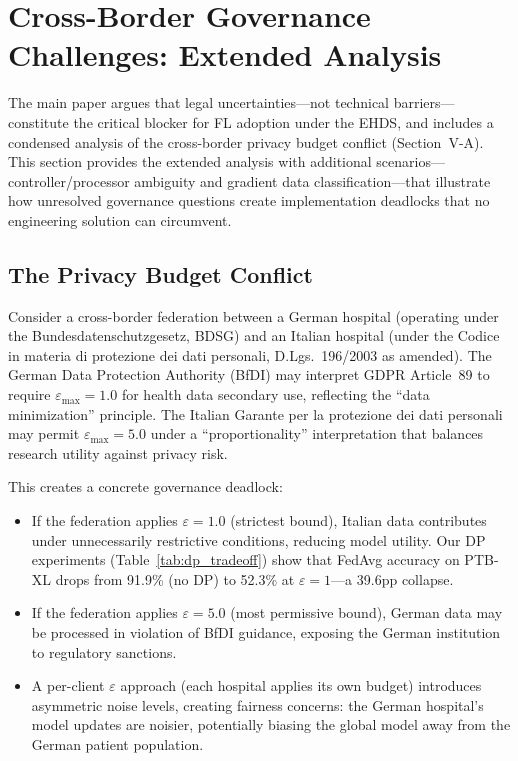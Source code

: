 \documentclass[conference,a4paper]{IEEEtran}
\begin{document}
\section{Cross-Border Governance Challenges: Extended Analysis}
\label{sec:governance_challenges}

The main paper argues that legal uncertainties---not technical barriers---constitute the critical blocker for FL adoption under the EHDS, and includes a condensed analysis of the cross-border privacy budget conflict (Section~V-A). This section provides the extended analysis with additional scenarios---controller/processor ambiguity and gradient data classification---that illustrate how unresolved governance questions create implementation deadlocks that no engineering solution can circumvent.

\subsection{The Privacy Budget Conflict}

Consider a cross-border federation between a German hospital (operating under the Bundesdatenschutzgesetz, BDSG) and an Italian hospital (under the Codice in materia di protezione dei dati personali, D.Lgs.~196/2003 as amended). The German Data Protection Authority (BfDI) may interpret GDPR Article~89 to require $\varepsilon_{\max} = 1.0$ for health data secondary use, reflecting the ``data minimization'' principle. The Italian Garante per la protezione dei dati personali may permit $\varepsilon_{\max} = 5.0$ under a ``proportionality'' interpretation that balances research utility against privacy risk.

This creates a concrete governance deadlock:
\begin{itemize}
    \item If the federation applies $\varepsilon = 1.0$ (strictest bound), Italian data contributes under unnecessarily restrictive conditions, reducing model utility. Our DP experiments (Table~\ref{tab:dp_tradeoff}) show that FedAvg accuracy on PTB-XL drops from 91.9\% (no DP) to 52.3\% at $\varepsilon = 1$---a 39.6pp collapse.
    \item If the federation applies $\varepsilon = 5.0$ (most permissive bound), German data may be processed in violation of BfDI guidance, exposing the German institution to regulatory sanctions.
    \item A per-client $\varepsilon$ approach (each hospital applies its own budget) introduces asymmetric noise levels, creating fairness concerns: the German hospital's model updates are noisier, potentially biasing the global model away from the German patient population.
\end{itemize}
\end{document}
